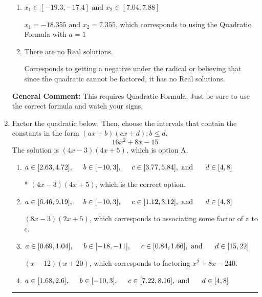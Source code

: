 \documentclass{extbook}[14pt]
\newcommand{\litem}[1]{\item #1

\rule{\textwidth}{0.4pt}}
\begin{document}
\begin{enumerate}
{\begin{enumerate}[label=\Alph*.]
 $x_1 = -0.490 \text{ and } x_2 = 1.224$, which corresponds to writing the Quadratic Formula as $\frac{b \pm \sqrt{b^2 - 4ac}}{2a}$
\item \( x_1 \in [-19.3, -17.4] \text{ and } x_2 \in [7.04, 7.88] \)

 $x_1 = -18.355 \text{ and } x_2 = 7.355$, which corresponds to using the Quadratic Formula with $a=1$
\item \( \text{There are no Real solutions.} \)

Corresponds to getting a negative under the radical or believing that since the quadratic cannot be factored, it has no Real solutions.
\end{enumerate}

\textbf{General Comment:} This requires Quadratic Formula. Just be sure to use the correct formula and watch your signs.
}
\litem{
Factor the quadratic below. Then, choose the intervals that contain the constants in the form $(ax+b)(cx+d); b \leq d.$
\[ 16x^{2} +8 x -15 \]The solution is \( (4x -3)(4x + 5) \), which is option A.\begin{enumerate}[label=\Alph*.]
\item \( a \in [2.63, 4.72], \hspace*{5mm} b \in [-10, 3], \hspace*{5mm} c \in [3.77, 5.84], \text{ and } \hspace*{5mm} d \in [4, 8] \)

* $(4x -3)(4x + 5)$, which is the correct option.
\item \( a \in [6.46, 9.19], \hspace*{5mm} b \in [-10, 3], \hspace*{5mm} c \in [1.12, 3.12], \text{ and } \hspace*{5mm} d \in [4, 8] \)

 $(8x -3)(2x + 5)$, which corresponds to associating some factor of a to c.
\item \( a \in [0.69, 1.04], \hspace*{5mm} b \in [-18, -11], \hspace*{5mm} c \in [0.84, 1.66], \text{ and } \hspace*{5mm} d \in [15, 22] \)

 $(x -12)(x + 20)$, which corresponds to factoring $x^{2} +8 x -240$.
\item \( a \in [1.68, 2.6], \hspace*{5mm} b \in [-10, 3], \hspace*{5mm} c \in [7.22, 8.16], \text{ and } \hspace*{5mm} d \in [4, 8] \)


\end{enumerate}}
\end{enumerate}
\end{document}
